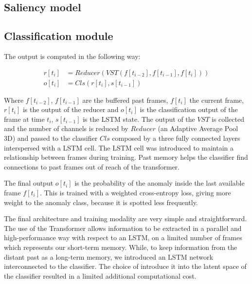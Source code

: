 \subsection{Saliency model}


\subsection{Classification module}

The output is computed in the following way:

\begin{equation}
\begin{split}
    r[t_{i}] &= Reducer(VST(f[t_{i-2}], f[t_{i-1}], f[t_{i}])) \\
    o[t_{i}] &= Cls(r[t_{i}], s[t_{i-1}])
\end{split}
\end{equation}

\noindent Where $f[t_{i-2}]$, $f[t_{i-1}]$ are the buffered past frames, $f[t_{i}]$ the current frame, $r[t_{i}]$ is the output of the reducer and $o[t_{i}]$ is the classification output of the frame at time $t_{i}$, $s[t_{i-1}]$ is the LSTM state.
The output of the $VST$ is collected and the number of channels is reduced by $Reducer$ (an Adaptive Average Pool 3D) and passed to the classifier $Cls$ composed by a three fully connected layers interspersed with a LSTM cell.
The LSTM cell was introduced to maintain a relationship between frames during training.
Past memory helps the classifier find connections to past frames out of reach of the transformer.

The final output $o[t_{i}]$ is the probability of the anomaly inside the last available frame $f[t_{i}]$.
This is trained with a weighted cross-entropy loss, giving more weight to the anomaly class, because it is spotted less frequently.

The final architecture and training modality are very simple and straightforward.
The use of the Transformer allows information to be extracted in a parallel and high-performance way with respect to an LSTM, on a limited number of frames which represents our short-term memory.
While, to keep information from the distant past as a long-term memory, we introduced an LSTM network interconnected to the classifier.
The choice of introduce it into the latent space of the classifier resulted in a limited additional computational cost.

